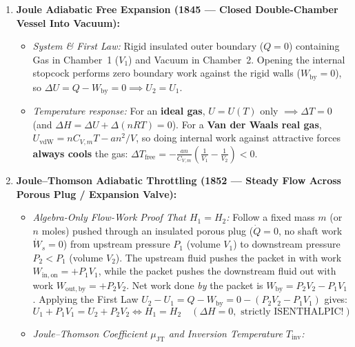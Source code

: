 \begin{formulacard}
\begin{enumerate}
  \item \textbf{Joule Adiabatic Free Expansion (1845 — Closed Double-Chamber Vessel Into Vacuum):}
  \begin{itemize}
    \item \emph{System \& First Law:} Rigid insulated outer boundary ($Q = 0$) containing Gas in Chamber~1 ($V_1$) and Vacuum in Chamber~2. Opening the internal stopcock performs zero boundary work against the rigid walls ($W_{\mathrm{by}} = 0$), so $\boxed{\Delta U = Q - W_{\mathrm{by}} = 0 \implies U_2 = U_1}$.
    \item \emph{Temperature response:} For an \textbf{ideal gas}, $U = U(T)$ only $\implies \Delta T = 0$ (and $\Delta H = \Delta U + \Delta(nRT) = 0$). For a \textbf{Van der Waals real gas}, $U_{\mathrm{vdW}} = nC_{V,m}T - an^2/V$, so doing internal work against attractive forces \textbf{always cools} the gas: $\Delta T_{\mathrm{free}} = -\frac{an}{C_{V,m}}\left(\frac{1}{V_1} - \frac{1}{V_2}\right) < 0$.
  \end{itemize}
  \item \textbf{Joule--Thomson Adiabatic Throttling (1852 — Steady Flow Across Porous Plug / Expansion Valve):}
  \begin{itemize}
    \item \emph{Algebra-Only Flow-Work Proof That $H_1 = H_2$:} Follow a fixed mass $m$ (or $n$ moles) pushed through an insulated porous plug ($\dot{Q} = 0$, no shaft work $\dot{W}_s = 0$) from upstream pressure $P_1$ (volume $V_1$) to downstream pressure $P_2 < P_1$ (volume $V_2$). The upstream fluid pushes the packet in with work $W_{\mathrm{in,on}} = +P_1 V_1$, while the packet pushes the downstream fluid out with work $W_{\mathrm{out,by}} = +P_2 V_2$. Net work done \emph{by} the packet is $W_{\mathrm{by}} = P_2 V_2 - P_1 V_1$. Applying the First Law $U_2 - U_1 = Q - W_{\mathrm{by}} = 0 - (P_2 V_2 - P_1 V_1)$ gives:
    \begin{equation}\label{eq:07:throttling-h}
      \boxed{U_1 + P_1 V_1 = U_2 + P_2 V_2 \iff H_1 = H_2 \quad (\Delta H = 0, \text{ strictly ISENTHALPIC!})}
    \end{equation}
    \item \emph{Joule--Thomson Coefficient $\mu_{\mathrm{JT}}$ and Inversion Temperature $T_{\mathrm{inv}}$:}

\end{itemize}
\end{enumerate}
\end{formulacard}
